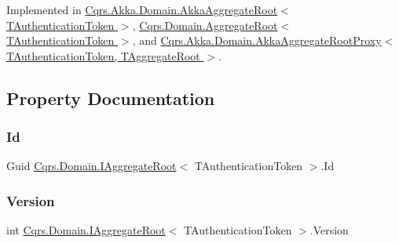 Implemented in \hyperlink{classCqrs_1_1Akka_1_1Domain_1_1AkkaAggregateRoot_a0d2615067175e5f8249bb2dc3d17ee0b_a0d2615067175e5f8249bb2dc3d17ee0b}{Cqrs.\+Akka.\+Domain.\+Akka\+Aggregate\+Root$<$ T\+Authentication\+Token $>$}, \hyperlink{classCqrs_1_1Domain_1_1AggregateRoot_adab968b830e186cb832583910bf6f3a6_adab968b830e186cb832583910bf6f3a6}{Cqrs.\+Domain.\+Aggregate\+Root$<$ T\+Authentication\+Token $>$}, and \hyperlink{classCqrs_1_1Akka_1_1Domain_1_1AkkaAggregateRootProxy_aaa8a46fee21b6133ae4d1b2f60983d7e_aaa8a46fee21b6133ae4d1b2f60983d7e}{Cqrs.\+Akka.\+Domain.\+Akka\+Aggregate\+Root\+Proxy$<$ T\+Authentication\+Token, T\+Aggregate\+Root $>$}.



\subsection{Property Documentation}
\mbox{\label{interfaceCqrs_1_1Domain_1_1IAggregateRoot_a04aa3198f1371afa345a58e8fcb713d7_a04aa3198f1371afa345a58e8fcb713d7}} 
\subsubsection{\texorpdfstring{Id}{Id}}
{\footnotesize\ttfamily Guid \hyperlink{interfaceCqrs_1_1Domain_1_1IAggregateRoot}{Cqrs.\+Domain.\+I\+Aggregate\+Root}$<$ T\+Authentication\+Token $>$.Id\hspace{0.3cm}{\ttfamily [get]}}

\mbox{\label{interfaceCqrs_1_1Domain_1_1IAggregateRoot_ad81adab68c0984330f735a1f5a661aa7_ad81adab68c0984330f735a1f5a661aa7}} 
\subsubsection{\texorpdfstring{Version}{Version}}
{\footnotesize\ttfamily int \hyperlink{interfaceCqrs_1_1Domain_1_1IAggregateRoot}{Cqrs.\+Domain.\+I\+Aggregate\+Root}$<$ T\+Authentication\+Token $>$.Version\hspace{0.3cm}{\ttfamily [get]}}

